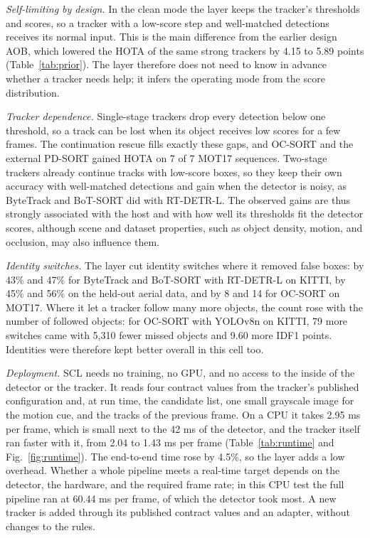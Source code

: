\documentclass[pdflatex,sn-mathphys-num,iicol]{sn-jnl}
\newcommand{\scl}{SCL}
\newcommand{\aob}{AOB}
\begin{document}
\emph{Self-limiting by design.} In the clean mode the layer keeps the tracker's thresholds and
scores, so a tracker with a low-score step and well-matched detections receives its normal input.
This is the main difference from the earlier design \aob{}, which lowered the HOTA of the same
strong trackers by 4.15 to 5.89 points (Table~\ref{tab:prior}). The layer therefore does not need
to know in advance whether a tracker needs help; it infers the operating mode from the score
distribution.

\emph{Tracker dependence.} Single-stage trackers drop every detection below one threshold, so a
track can be lost when its object receives low scores for a few frames. The continuation rescue
fills exactly these gaps, and OC-SORT and the external PD-SORT gained HOTA on 7 of 7 MOT17 sequences.
Two-stage trackers already continue tracks with low-score boxes, so they keep their own accuracy
with well-matched detections and gain when the detector is noisy, as ByteTrack and BoT-SORT did with
RT-DETR-L. The observed gains are thus strongly associated with the host and with how well its
thresholds fit the detector scores, although scene and dataset properties, such as object density,
motion, and occlusion, may also influence them.

\emph{Identity switches.} The layer cut identity switches where it removed false boxes: by 43\% and
47\% for ByteTrack and BoT-SORT with RT-DETR-L on KITTI, by 45\% and 56\% on the held-out aerial
data, and by 8 and 14 for OC-SORT on MOT17. Where it let a tracker follow many more objects, the
count rose with the number of followed objects: for OC-SORT with YOLOv8n on KITTI, 79 more switches
came with 5,310 fewer missed objects and 9.60 more IDF1 points. Identities were therefore kept
better overall in this cell too.

\emph{Deployment.} \scl{} needs no training, no GPU, and no access to the inside of the detector or
the tracker. It reads four contract values from the tracker's published configuration and, at run
time, the candidate list, one small grayscale image for the motion cue, and the tracks of the
previous frame. On a CPU it takes 2.95 ms per frame, which is small next to the 42 ms of the
detector, and the tracker itself ran faster with it, from 2.04 to 1.43 ms per frame
(Table~\ref{tab:runtime} and Fig.~\ref{fig:runtime}). The end-to-end time rose by 4.5\%, so the
layer adds a low overhead. Whether a whole pipeline meets a real-time target depends on the
detector, the hardware, and the required frame rate; in this CPU test the full pipeline ran at
60.44 ms per frame, of which the detector took most. A new tracker is added through its published
contract values and an adapter, without changes to the rules.
\end{document}
